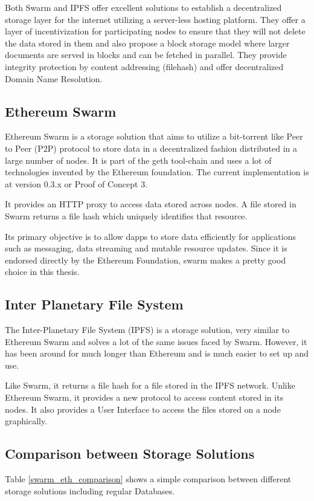 \documentclass[11pt,openright]{report}
\begin{document}
Both Swarm and IPFS offer excellent solutions to establish a decentralized storage layer for the internet utilizing a server-less hosting platform. They offer a layer of incentivization for participating nodes to ensure that they will not delete the data stored in them and also propose a block storage model where larger documents are served in blocks and can be fetched in parallel. They provide integrity protection by content addressing (filehash) and offer decentralized Domain Name Resolution.

\subsection{Ethereum Swarm}
Ethereum Swarm \cite{swarm} is a storage solution that aims to utilize a bit-torrent like Peer to Peer (P2P) protocol to store data in a decentralized fashion distributed in a large number of nodes. It is part of the geth tool-chain and uses a lot of technologies invented by the Ethereum foundation. The current implementation is at version 0.3.x or Proof of Concept 3. 

It provides an HTTP proxy to access data stored across nodes. A file stored in Swarm returns a file hash which uniquely identifies that resource.

Its primary objective is to allow dapps to store data efficiently for applications such as messaging, data streaming and mutable resource updates. Since it is endorsed directly by the Ethereum Foundation, swarm makes a pretty good choice in this thesis.


\subsection{Inter Planetary File System}
The Inter-Planetary File System (IPFS) \cite{ipfs2014} is a storage solution, very similar to Ethereum Swarm and solves a lot of the same issues faced by Swarm. However, it has been around for much longer than Ethereum and is much easier to set up and use.

Like Swarm, it returns a file hash for a file stored in the IPFS network. Unlike Ethereum Swarm, it provides a new protocol to access content stored in its nodes. It also provides a User Interface to access the files stored on a node graphically.

\subsection{Comparison between Storage Solutions}
Table \ref{swarm_eth_comparison} shows a simple comparison between different storage solutions including regular Databases.
\end{document}
